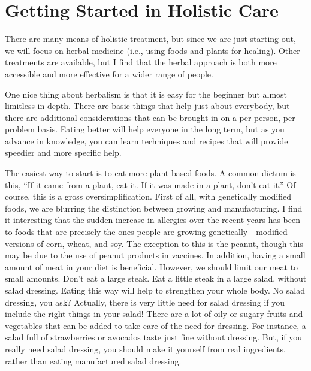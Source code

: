 \section{Getting Started in Holistic Care}

There are many means of holistic treatment,
but since we are just
starting out, we will focus on herbal medicine
(i.e., using foods
and plants for
healing). Other
treatments are available, but I find that the herbal approach is both
more accessible and more effective for a wider
range of people.

One nice thing about herbalism is that it is easy for the beginner but
almost limitless in depth. There are basic things that help just about
everybody, but there are additional considerations that can be brought
in on a per-person, per-problem basis. Eating better will help everyone
in the long term, but as you advance in knowledge, you can learn
techniques and recipes that will provide speedier and more specific
help. 

The easiest way to start is to eat more plant-based foods. A common
dictum is this, ``If it came from a plant, eat it. If it
was made in a plant, don't eat it.''  Of
course, this is a gross oversimplification. First of all, with
genetically modified foods, we are blurring the distinction between
growing and manufacturing. I find it interesting that the sudden
increase in allergies over the recent years has been to foods that are
precisely the ones people are growing genetically—modified versions of
corn, wheat, and soy. The exception to this is the peanut, though
this may be due to the use of peanut products in vaccines. In addition,
having a small amount of meat in your diet is beneficial. However, we
should limit our meat to small amounts. Don't eat a
large steak. Eat a little steak in a large salad, without salad
dressing. Eating this way will help to strengthen your whole body.  No
salad dressing, you ask?  Actually, there is very little need for salad
dressing if you include the right things in your salad!  There are a
lot of oily or sugary fruits and vegetables that can be added to take
care of the need for dressing.  For instance, a salad full of
strawberries or avocados taste just fine without dressing.  But, if you
really need salad dressing, you should make it yourself from real
ingredients, rather than eating manufactured salad dressing.

